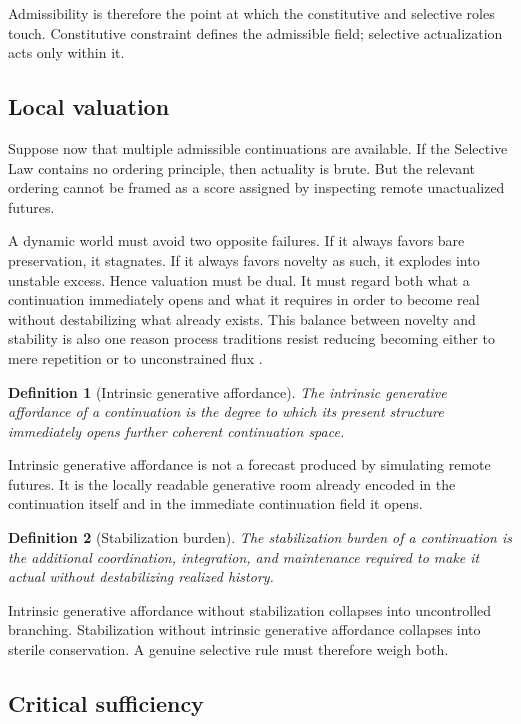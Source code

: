 \documentclass[11pt]{article}
\theoremstyle{foundation}
\newtheorem{definition}{Definition}
\begin{document}
Admissibility is therefore the point at which the constitutive and selective roles touch. Constitutive constraint defines the admissible field; selective actualization acts only within it.

\subsection{Local valuation}

Suppose now that multiple admissible continuations are available. If the Selective Law contains no ordering principle, then actuality is brute. But the relevant ordering cannot be framed as a score assigned by inspecting remote unactualized futures.

A dynamic world must avoid two opposite failures. If it always favors bare preservation, it stagnates. If it always favors novelty as such, it explodes into unstable excess. Hence valuation must be dual. It must regard both what a continuation immediately opens and what it requires in order to become real without destabilizing what already exists. This balance between novelty and stability is also one reason process traditions resist reducing becoming either to mere repetition or to unconstrained flux \citep{Whitehead1929,Rescher1996,Cartwright1999}.

\begin{definition}[Intrinsic generative affordance]
The intrinsic generative affordance of a continuation is the degree to which its present structure immediately opens further coherent continuation space.
\end{definition}

Intrinsic generative affordance is not a forecast produced by simulating remote futures. It is the locally readable generative room already encoded in the continuation itself and in the immediate continuation field it opens.

\begin{definition}[Stabilization burden]
The stabilization burden of a continuation is the additional coordination, integration, and maintenance required to make it actual without destabilizing realized history.
\end{definition}

Intrinsic generative affordance without stabilization collapses into uncontrolled branching. Stabilization without intrinsic generative affordance collapses into sterile conservation. A genuine selective rule must therefore weigh both.

\subsection{Critical sufficiency}
\end{document}
